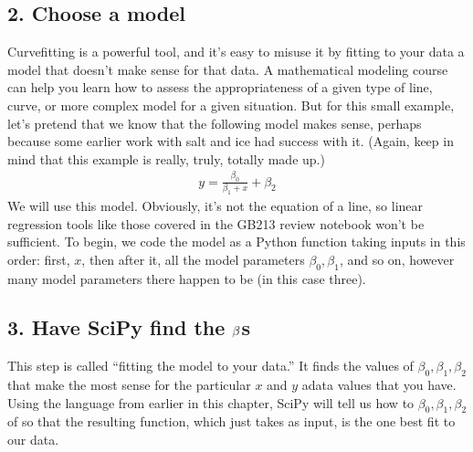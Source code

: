 \documentclass[letterpaper,10pt,english]{sphinxmanual}
\begin{document}
\subsection{2. Choose a model}
\label{\detokenize{chapter-9-math-and-stats:choose-a-model}}
Curve\sphinxhyphen{}fitting is a powerful tool, and it’s easy to misuse it by fitting to your data a model that doesn’t make sense for that data.  A mathematical modeling course can help you learn how to assess the appropriateness of a given type of line, curve, or more complex model for a given situation.  But for this small example, let’s pretend that we know that the following model makes sense, perhaps because some earlier work with salt and ice had success with it.  (Again, keep in mind that this example is really, truly, totally made up.)
\begin{equation*}
\begin{split} y=\frac{\beta_0}{\beta_1+x}+\beta_2 \end{split}
\end{equation*}
We will use this model.  Obviously, it’s not the equation of a line, so linear regression tools like those covered in the GB213 review notebook won’t be sufficient.  To begin, we code the model as a Python function taking inputs in this order: first, \(x\), then after it, all the model parameters \(\beta_0,\beta_1\), and so on, however many model parameters there happen to be (in this case three).

\begin{sphinxVerbatim}[commandchars=\\\{\}]
       
             
\end{sphinxVerbatim}


\subsection{3. Have SciPy find the \protect\(\beta\protect\)s}
\label{\detokenize{chapter-9-math-and-stats:have-scipy-find-the-betas}}
This step is called “fitting the model to your data.”  It finds the values of \(\beta_0,\beta_1,\beta_2\) that make the most sense for the particular \(x\) and \(y\) adata values that you have.  Using the language from earlier in this chapter, SciPy will tell us how to  \(\beta_0,\beta_1,\beta_2\) of  so that the resulting function, which just takes  as input, is the one best fit to our data.
\end{document}
